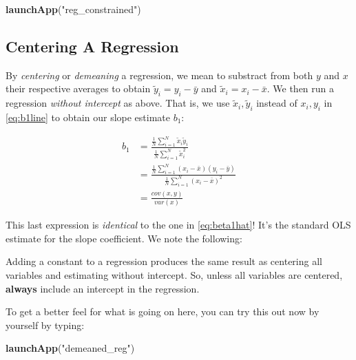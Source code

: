 \documentclass[]{book}
\newenvironment{Shaded}{\begin{snugshade}}{\end{snugshade}}
\newcommand{\KeywordTok}[1]{\textcolor[rgb]{0.13,0.29,0.53}{\textbf{#1}}}
\newcommand{\NormalTok}[1]{#1}
\newcommand{\StringTok}[1]{\textcolor[rgb]{0.31,0.60,0.02}{#1}}
\newenvironment{tip}{\begin{tcolorbox}[colback=green!5!white,colframe=green]}{\end{tcolorbox}}
\begin{document}
\begin{Shaded}
\begin{Highlighting}[]
\KeywordTok{launchApp}\NormalTok{(}\StringTok{"reg_constrained"}\NormalTok{)}
\end{Highlighting}
\end{Shaded}

\hypertarget{centering-a-regression}{%
\subsection{Centering A Regression}\label{centering-a-regression}}

By \emph{centering} or \emph{demeaning} a regression, we mean to substract from both \(y\) and \(x\) their respective averages to obtain \(\tilde{y}_i = y_i - \bar{y}\) and \(\tilde{x}_i = x_i - \bar{x}\). We then run a regression \emph{without intercept} as above. That is, we use \(\tilde{x}_i,\tilde{y}_i\) instead of \(x_i,y_i\) in \eqref{eq:b1line} to obtain our slope estimate \(b_1\):

\begin{align}
b_1 &= \frac{\frac{1}{N}\sum_{i=1}^N \tilde{x}_i \tilde{y}_i}{\frac{1}{N}\sum_{i=1}^N \tilde{x}_i^2}\\
    &= \frac{\frac{1}{N}\sum_{i=1}^N (x_i - \bar{x}) (y_i - \bar{y})}{\frac{1}{N}\sum_{i=1}^N (x_i - \bar{x})^2} \\
    &= \frac{cov(x,y)}{var(x)}
    \label{eq:bline-centered}
\end{align}

This last expression is \emph{identical} to the one in \eqref{eq:beta1hat}! It's the standard OLS estimate for the slope coefficient. We note the following:

\begin{tip}
Adding a constant to a regression produces the same result as centering
all variables and estimating without intercept. So, unless all variables
are centered, \textbf{always} include an intercept in the regression.
\end{tip}

To get a better feel for what is going on here, you can try this out now by yourself by typing:

\begin{Shaded}
\begin{Highlighting}[]
\KeywordTok{launchApp}\NormalTok{(}\StringTok{"demeaned_reg"}\NormalTok{)}
\end{Highlighting}
\end{Shaded}
\end{document}
